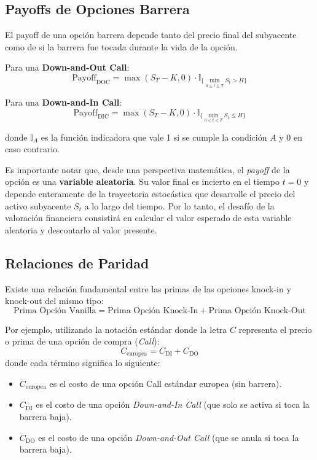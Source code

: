 \subsection{Payoffs de Opciones Barrera}

El payoff de una opción barrera depende tanto del precio final del subyacente como de si la barrera fue tocada durante la vida de la opción.

Para una \textbf{Down-and-Out Call}:
\begin{equation}
\text{Payoff}_{\text{DOC}} = \max(S_T - K, 0) \cdot \mathbb{I}_{\{\min_{0 \leq t \leq T} S_t > H\}}
\end{equation}

Para una \textbf{Down-and-In Call}:
\begin{equation}
\text{Payoff}_{\text{DIC}} = \max(S_T - K, 0) \cdot \mathbb{I}_{\{\min_{0 \leq t \leq T} S_t \leq H\}}
\end{equation}

donde $\mathbb{I}_A$ es la función indicadora que vale 1 si se cumple la condición $A$ y 0 en caso contrario.

Es importante notar que, desde una perspectiva matemática, el \textit{payoff} de la opción es una \textbf{variable aleatoria}. Su valor final es incierto en el tiempo $t=0$ y depende enteramente de la trayectoria estocástica que desarrolle el precio del activo subyacente $S_t$ a lo largo del tiempo. Por lo tanto, el desafío de la valoración financiera consistirá en calcular el valor esperado de esta variable aleatoria y descontarlo al valor presente.

\subsection{Relaciones de Paridad}

Existe una relación fundamental entre las primas de las opciones knock-in y knock-out del mismo tipo:
\begin{equation}
\text{Prima Opción Vanilla} = \text{Prima Opción Knock-In} + \text{Prima Opción Knock-Out}
\end{equation}

Por ejemplo, utilizando la notación estándar donde la letra $C$ representa el precio o prima de una opción de compra (\textit{Call}):
\begin{equation}
C_{\text{europea}} = C_{\text{DI}} + C_{\text{DO}}
\end{equation}
donde cada término significa lo siguiente:
\begin{itemize}
    \item $C_{\text{europea}}$ es el costo de una opción Call estándar europea (sin barrera).
    \item $C_{\text{DI}}$ es el costo de una opción \textit{Down-and-In Call} (que solo se activa si toca la barrera baja).
    \item $C_{\text{DO}}$ es el costo de una opción \textit{Down-and-Out Call} (que se anula si toca la barrera baja).
\end{itemize}

